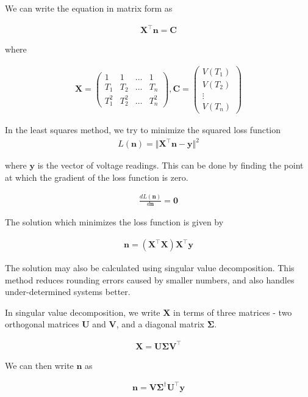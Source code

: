 \documentclass{article}
\let\vec\mathbf
\newcommand{\myvec}[1]{\ensuremath{\begin{pmatrix}#1\end{pmatrix}}}
\begin{document}
We can write the equation in matrix form as

\begin{align*}
    \vec{X}^\top \vec{n} = \vec{C}
\end{align*}

where

\begin{align*}
    \vec{X} = \myvec{1 & 1 & \dots & 1 \\ T_1 & T_2 & \dots & T_n \\ T_1^2 & T_2^2 & \dots & T_n^2},
    \vec{C} = \myvec{V(T_1) \\ V(T_2) \\ \vdots \\ V(T_n)}
\end{align*}

In the least squares method, we try to minimize the squared loss function
\begin{align*}
 L(\vec{n}) = \Vert \vec{X}^\top\vec{n} - \vec{y} \Vert^2
\end{align*}

where $\vec{y}$ is the vector of voltage readings. This can be done by finding 
the point at which the gradient of the loss function is zero.

\begin{align*}
    \frac{dL(\vec{n})}{d\vec{n}} = \vec{0}
\end{align*}

The solution which minimizes the loss function is given by

\begin{align*}
    \vec{n} = \left( \vec{X}^\top \vec{X} \right) \vec{X}^\top \vec{y}
\end{align*}

The solution may also be calculated using singular value decomposition.
This method reduces rounding errors caused by smaller numbers, and also
handles under-determined systems better.

In singular value decomposition, we write $\vec{X}$ in terms of three matrices - 
two orthogonal matrices $\vec{U}$ and $\vec{V}$, and a diagonal matrix $\vec{\Sigma}$.

\begin{align*}
    \vec{X} = \vec{U}\vec{\Sigma}\vec{V}^\top
\end{align*}

We can then write $\vec{n}$ as 

\begin{align*}
    \vec{n} = \vec{V}\vec{\Sigma}^\dagger \vec{U}^\top \vec{y}
\end{align*}
\end{document}
